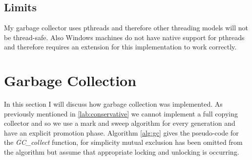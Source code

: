 \documentclass[../diss.tex]{subfiles}
\begin{document}
\subsection{Limits} \label{sec:threadslimits}

My garbage collector uses pthreads and therefore other threading models will not be thread-safe. Also Windows machines do not have native support for pthreads and therefore requires an extension for this implementation to work correctly.

\section{Garbage Collection} \label{sec:garbagecollection}

In this section I will discuss how garbage collection was implemented. As previously mentioned in \cref{lab:conservative} we cannot implement a full copying collector and so we use a mark and sweep algorithm for every generation and have an explicit promotion phase. Algorithm \ref{alg:gc} gives the pseudo-code for the \emph{GC\_collect} function, for simplicity mutual exclusion has been omitted from the algorithm but assume that appropriate locking and unlocking is occurring. 
\end{document}
